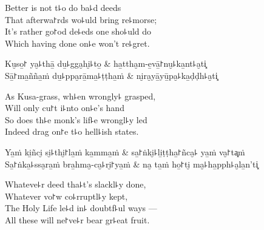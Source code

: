 \begin{english}
  Better is not t꜕o do ba꜕d deeds\\
  That afterwa꜓rds wo꜕uld bring re꜕morse;\\
  It's rather go꜓od de꜕eds one sho꜕uld do\\
  Which having done on꜕e won't re꜕gret.
\end{english}

\clearpage

\begin{twochants}
  Ku̮so̱꜓ ya̮꜕thā̱ du̱꜕gga̮hi̮꜕to̱ & ha̱ttha̮m-e̱vā̱꜓nu̮꜕ka̱nt꜕a̮ti͓ \\
  Sā̱꜓ma̱ñña̱ṁ du̱꜕ppa̮rā̱ma̱꜕ṭṭha̱ṁ & ni̮ra̮yā̱yū̱pa̮꜕ka̱ḍḍh꜕a̮ti͓ \\
\end{twochants}

\begin{english}
  As Kusa-grass, wh꜕en wrongly꜕ grasped,\\
  Will only cu꜓t i꜕nto on꜕e's hand\\
  So does th꜕e monk's lif꜕e wrongl꜕y led\\
  Indeed drag on꜓e t꜕o hell꜕ish states.
\end{english}

\begin{twochants}
  Ya̱ṁ ki̱ñci̮ si̮꜕thi̮꜓la̱ṁ ka̱mma̱ṁ & sa̱꜓ṅki̮꜕li̱ṭṭha̱꜓ñca̮꜕ ya̱ṁ va̮꜓ta͓ṁ \\
  Sa̱꜓ṅka̱꜕ssa̮ra̱ṁ bra̱hma̮-ca̮꜕ri̮꜓ya̱ṁ & na̮ ta̱ṁ ho̱꜓ti̮ ma̮꜕ha̱pph꜕a̮la̱n'ti͓ \\
\end{twochants}

\begin{english}
  Whateve꜕r deed tha꜕t's slackl꜕y done,\\
  Whatever vo꜓w co꜕rruptl꜕y kept,\\
  The Holy Life le꜕d in꜕ doubtf꜕ul ways ---\\
  All these will ne꜓ve꜕r bear gr꜕eat fruit.
\end{english}

